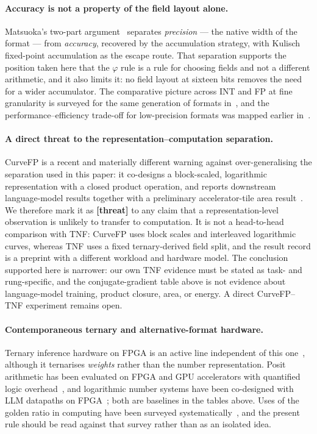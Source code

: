 \documentclass[11pt]{article}
\theoremstyle{definition}
\begin{document}
\paragraph{Accuracy is not a property of the field layout alone.} Matsuoka's
two-part argument~\cite{matsuoka2026fp8a,matsuoka2026fp8b} separates
\emph{precision} --- the native width of the format --- from \emph{accuracy},
recovered by the accumulation strategy, with Kulisch fixed-point accumulation as
the escape route. That separation supports the position taken here that the
$\varphi$ rule is a rule for choosing fields and not a different arithmetic, and
it also limits it: no field layout at sixteen bits removes the need for a wider
accumulator. The comparative picture across INT and FP at fine granularity is
surveyed for the same generation of formats in~\cite{int_vs_fp2025}, and the
performance--efficiency trade-off for low-precision formats was mapped
earlier in~\cite{mlformats}.

\paragraph{A direct threat to the representation--computation separation.}
CurveFP is a recent and materially different warning against over-generalising
the separation used in this paper: it co-designs a block-scaled,
logarithmic representation with a closed product operation, and reports
downstream language-model results together with a preliminary accelerator-tile
area result~\cite{qiao2026curvefp}. We therefore mark it as
\textbf{[threat]} to any claim that a representation-level observation is
unlikely to transfer to computation. It is not a head-to-head comparison with
TNF: CurveFP uses block scales and interleaved logarithmic curves, whereas TNF
uses a fixed ternary-derived field split, and the result record is a preprint
with a different workload and hardware model. The conclusion supported here is
narrower: our own TNF evidence must be stated as task- and rung-specific, and
the conjugate-gradient table above is not evidence about language-model
training, product closure, area, or energy. A direct CurveFP--TNF experiment
remains open.

\paragraph{Contemporaneous ternary and alternative-format hardware.} Ternary
inference hardware on FPGA is an active line independent of this
one~\cite{tereffic2025,tenet2025}, although it ternarises \emph{weights} rather
than the number representation. Posit arithmetic has been evaluated on FPGA and
GPU accelerators with quantified logic overhead~\cite{posit_accel2024}, and
logarithmic number systems have been co-designed with LLM datapaths on
FPGA~\cite{pnnl_lns2025}; both are baselines in the tables above. Uses of the
golden ratio in computing have been surveyed
systematically~\cite{akhtaruzzaman2024phi}, and the present rule should be read
against that survey rather than as an isolated idea.
\end{document}
